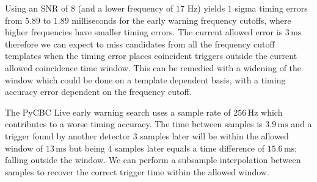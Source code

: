 %
Using an SNR of $8$ (and a lower frequency of $17$ Hz) yields $1$ sigma timing errors from $5.89$ to $1.89$ milliseconds for the early warning frequency cutoffs, where higher frequencies have smaller timing errors. The current allowed error is $3 \, \text{ms}$ therefore we can expect to miss candidates from all the frequency cutoff templates when the timing error places coincident triggers outside the current allowed coincidence time window. This can be remedied with a widening of the window which could be done on a template dependent basis, with a timing accuracy error dependent on the frequency cutoff.

The PyCBC Live early warning search uses a sample rate of $256 \, \text{Hz}$ which contributes to a worse timing accuracy. The time between samples is $3.9 \, \text{ms}$ and a trigger found by another detector $3$ samples later will be within the allowed window of $13 \, \text{ms}$ but being $4$ samples later equals a time difference of $15.6  \, \text{ms}$; falling outside the window. We can perform a subsample interpolation between samples to recover the correct trigger time within the allowed window.

